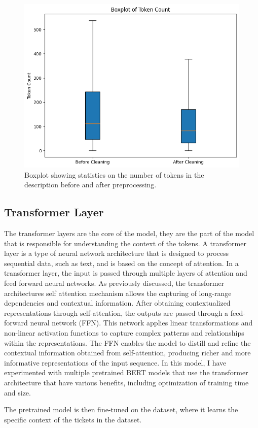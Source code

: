 \documentclass{UoYCSproject}
\begin{document}
    \begin{figure}[h]
        \includegraphics[width=\textwidth]{./figures/tokencount-prepost}
        \caption{Boxplot showing statistics on the number of tokens in the description before and after preprocessing.}
        \label{fig:token-boxplot}
    \end{figure}


    \subsection[transformer-layer]{Transformer Layer}
    The transformer layers are the core of the model, they are the part of the model that is responsible for understanding the context of the tokens.
    A transformer layer is a type of neural network architecture that is designed to process sequential data, such as text, and is based on the concept of attention.
    In a transformer layer, the input is passed through multiple layers of attention and feed forward neural networks.
    As previously discussed, the transformer architectures self attention mechanism allows the capturing of long-range dependencies and contextual information.
    After obtaining contextualized representations through self-attention, the outputs are passed through a feed-forward neural network (FFN).
    This network applies linear transformations and non-linear activation functions to capture complex patterns and relationships within the representations.
    The FFN enables the model to distill and refine the contextual information obtained from self-attention, producing richer and more informative representations of the input sequence.
    In this model, I have experimented with multiple pretrained BERT models that use the transformer architecture that have various benefits, including optimization of training time and size. \par
    The pretrained model is then fine-tuned on the dataset, where it learns the specific context of the tickets in the dataset.
\end{document}
